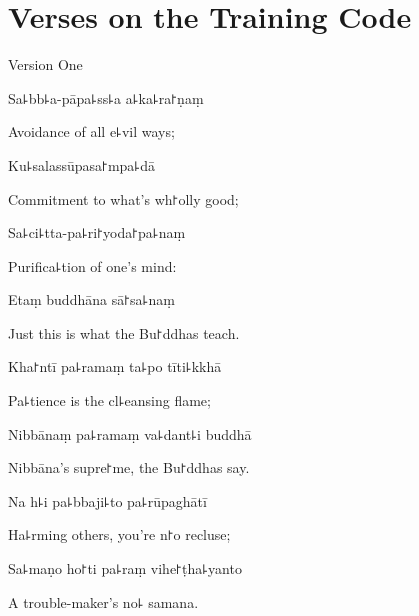 \chapter{Verses on the Training Code}%


\begin{leader}
\end{leader}

\begin{instruction}
  Version One
\end{instruction}

Sa꜕bb꜕a-pāpa꜕ss꜕a a꜕ka꜕ra꜓ṇaṃ

\begin{english}
  Avoidance of all e꜕vil ways;
\end{english}

Ku꜕salassūpasa꜓mpa꜕dā

\begin{english}
  Commitment to what's wh꜓olly good;
\end{english}

Sa꜕ci꜕tta-pa꜕ri꜓yoda꜓pa꜕naṃ

\begin{english}
  Purifica꜕tion of one's mind:
\end{english}

Etaṃ buddhāna sā꜓sa꜕naṃ

\begin{english}
  Just this is what the Bu꜓ddhas teach.
\end{english}

Kha꜓ntī pa꜕ramaṃ ta꜕po tīti꜕kkhā

\begin{english}
  Pa꜕tience is the cl꜕eansing flame;
\end{english}

Nibbānaṃ pa꜕ramaṃ va꜕dant꜕i buddhā

\begin{english}
  Nibbāna's supre꜓me, the Bu꜓ddhas say.
\end{english}

Na h꜕i pa꜕bbaji꜕to pa꜕rūpaghātī

\begin{english}
  Ha꜕rming others, you're n꜓o recluse;
\end{english}

Sa꜕maṇo ho꜓ti pa꜕raṃ vihe꜓ṭha꜕yanto

\begin{english}
  A trouble-maker's no꜕ samana.
\end{english}

